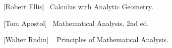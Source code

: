 \documentclass[12pt]{article}
\begin{document}
\begin{thebibliography}{9}

[Robert Ellis]~
Calculus with Analytic Geometry.

[Tom Apostol]~
Mathematical Analysis, 2nd ed.

[Walter Rudin]  ~
Principles of Mathematical Analysis.

\end{thebibliography}
\end{document}
